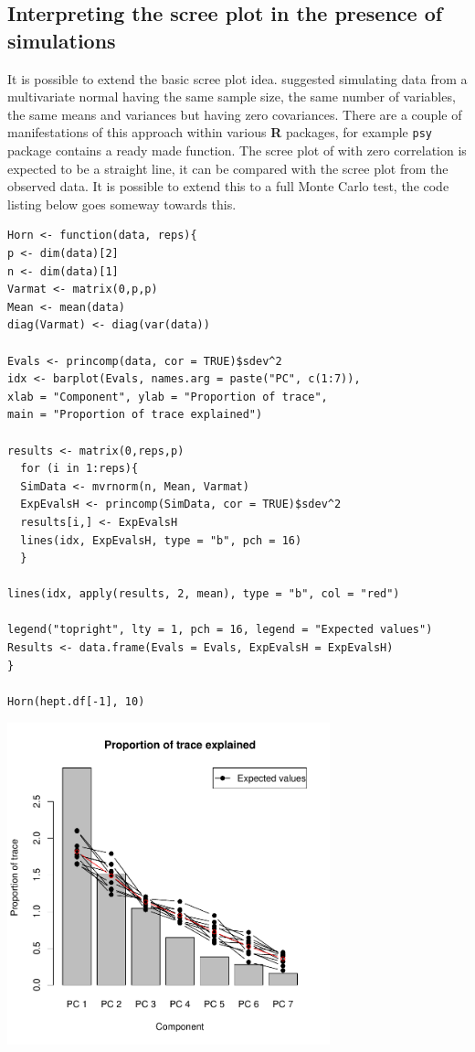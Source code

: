 \subsection{Interpreting the scree plot in the presence of simulations}
\label{screemc}

It is possible to extend the basic scree plot idea.   \cite{Horn:1965} suggested simulating data from a multivariate normal having the same sample size, the same number of variables, the same means and variances but having zero covariances.   There are a couple of manifestations of this approach within various \textbf{R} packages, for example \verb+psy+ package contains a ready made function.   The scree plot of with zero correlation is expected to be a straight line, it can be compared with the scree plot from the observed data.   It is possible to extend this to a full Monte Carlo test, the code listing below goes someway towards this.

\singlespacing
\begin{verbatim}
Horn <- function(data, reps){
p <- dim(data)[2]
n <- dim(data)[1]
Varmat <- matrix(0,p,p)
Mean <- mean(data)
diag(Varmat) <- diag(var(data))

Evals <- princomp(data, cor = TRUE)$sdev^2
idx <- barplot(Evals, names.arg = paste("PC", c(1:7)), 
xlab = "Component", ylab = "Proportion of trace", 
main = "Proportion of trace explained")

results <- matrix(0,reps,p)
  for (i in 1:reps){
  SimData <- mvrnorm(n, Mean, Varmat)
  ExpEvalsH <- princomp(SimData, cor = TRUE)$sdev^2
  results[i,] <- ExpEvalsH
  lines(idx, ExpEvalsH, type = "b", pch = 16)
  }

lines(idx, apply(results, 2, mean), type = "b", col = "red")

legend("topright", lty = 1, pch = 16, legend = "Expected values")
Results <- data.frame(Evals = Evals, ExpEvalsH = ExpEvalsH)
}

Horn(hept.df[-1], 10)
\end{verbatim}
\onehalfspacing

\includegraphics[width = 0.7\textwidth]{images/Horn}


